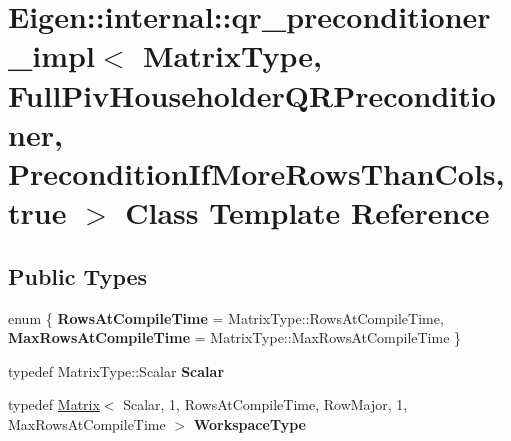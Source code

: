 \hypertarget{class_eigen_1_1internal_1_1qr__preconditioner__impl_3_01_matrix_type_00_01_full_piv_householder_b68efcf0da0383d73ce7fb20aafa2293}{}\section{Eigen\+::internal\+::qr\+\_\+preconditioner\+\_\+impl$<$ Matrix\+Type, Full\+Piv\+Householder\+Q\+R\+Preconditioner, Precondition\+If\+More\+Rows\+Than\+Cols, true $>$ Class Template Reference}
\label{class_eigen_1_1internal_1_1qr__preconditioner__impl_3_01_matrix_type_00_01_full_piv_householder_b68efcf0da0383d73ce7fb20aafa2293}
\subsection*{Public Types}
\begin{DoxyCompactItemize}
\item 
\mbox{\label{class_eigen_1_1internal_1_1qr__preconditioner__impl_3_01_matrix_type_00_01_full_piv_householder_b68efcf0da0383d73ce7fb20aafa2293_a9746c411fdae94bc17e32bad89ca5aef}} 
enum \{ {\bfseries Rows\+At\+Compile\+Time} = Matrix\+Type\+::Rows\+At\+Compile\+Time, 
{\bfseries Max\+Rows\+At\+Compile\+Time} = Matrix\+Type\+::Max\+Rows\+At\+Compile\+Time
 \}
\item 
\mbox{\label{class_eigen_1_1internal_1_1qr__preconditioner__impl_3_01_matrix_type_00_01_full_piv_householder_b68efcf0da0383d73ce7fb20aafa2293_a6598c76a30eba4be4175fd6024520646}} 
typedef Matrix\+Type\+::\+Scalar {\bfseries Scalar}
\item 
\mbox{\label{class_eigen_1_1internal_1_1qr__preconditioner__impl_3_01_matrix_type_00_01_full_piv_householder_b68efcf0da0383d73ce7fb20aafa2293_acd199f9e16acf39324487c2bcff62fc1}} 
typedef \mbox{\hyperlink{class_eigen_1_1_matrix}{Matrix}}$<$ Scalar, 1, Rows\+At\+Compile\+Time, Row\+Major, 1, Max\+Rows\+At\+Compile\+Time $>$ {\bfseries Workspace\+Type}
\end{DoxyCompactItemize}
